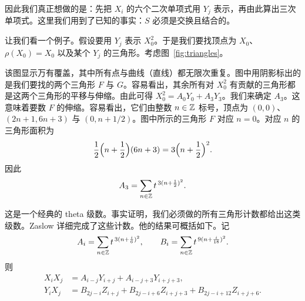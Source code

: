 
因此我们真正想做的是：先把 $X_i$ 的六个二次单项式用 $Y_j$ 表示，再由此算出三次单项式。这里我们用到了已知的事实：$S$ 必须是交换且结合的。

让我们看一个例子。假设要用 $Y_j$ 表示 $X_0^2$。于是我们要找顶点为 $X_0$、$\rho(X_0)=X_0$ 以及某个 $Y_j$ 的三角形。考虑图~\ref{fig:triangles}。


该图显示万有覆盖，其中所有点与曲线（直线）都无限次重复。图中用阴影标出的是我们要找的两个三角形 $F$ 与 $G$。容易看出，其余所有对 $X_0^2$ 有贡献的三角形都是这两个三角形的平移与伸缩。由此可得 $X_0^2=A_0Y_0+A_3Y_3$。我们来确定 $A_3$。这意味着要数 $F$ 的伸缩。容易看出，它们由整数 $n\in\mathbb{Z}$ 标号，顶点为 $(0,0)$、$(2n+1,6n+3)$ 与 $(0,n+1/2)$。图中所示的三角形 $F$ 对应 $n=0$。对应 $n$ 的三角形面积为
\[
\frac12\Bigl(n+\frac12\Bigr)(6n+3)=3\Bigl(n+\frac12\Bigr)^2 .
\]
因此
\[
A_3=\sum_{n\in\mathbb{Z}} t^{\,3(n+\frac12)^2}.
\]


这是一个经典的 theta 级数。事实证明，我们必须做的所有三角形计数都给出这类级数。Zaslow \cite{ref24} 详细完成了这些计数。他的结果可概括如下。记
\[
A_i=\sum_{n\in\mathbb{Z}} t^{\,3(n+\frac{i}{6})^2},
\qquad
B_i=\sum_{n\in\mathbb{Z}} t^{\,9(n+\frac{i}{18})^2}.
\]
则
\[
\begin{aligned}
X_iX_j &= A_{i-j}Y_{i+j}+A_{i-j+3}Y_{i+j+3},\\
Y_iX_j &= B_{2j-i}Z_{i+j}+B_{2j-i+6}Z_{i+j+3}+B_{2j-i+12}Z_{i+j+6}.
\end{aligned}
\]


